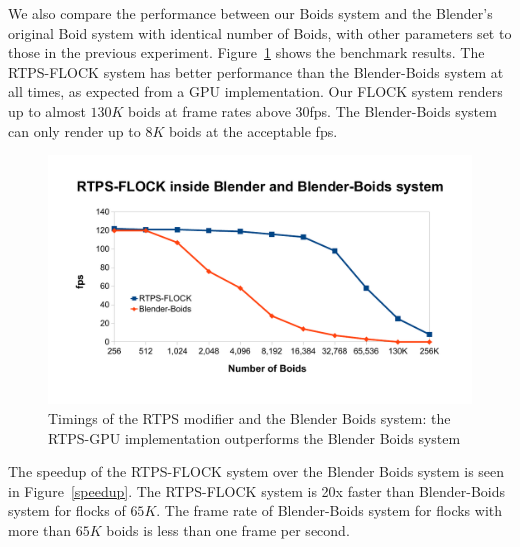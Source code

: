 We also compare the performance between our Boids system and the Blender's original Boid system with identical number of Boids, with other parameters set to 
those in the previous experiment.  
Figure~\ref{RTPSvsBlender} shows the benchmark results. 
The RTPS-FLOCK system has better performance than the Blender-Boids system 
at all times, as expected from a GPU implementation. 
Our FLOCK system renders up to almost $130K$ boids at frame rates above 30fps. 
The Blender-Boids system can only render up to $8K$ boids at the acceptable fps.

\begin{figure}[htbp]
\begin{center}
\includegraphics[scale=0.7]{figures/benchmarks.pdf}
\caption{Timings of the RTPS modifier and the Blender Boids system: the RTPS-GPU implementation outperforms the Blender Boids system}
\label{RTPSvsBlender}
\end{center}
\end{figure}

The speedup of the RTPS-FLOCK system over the Blender Boids system is seen in Figure~\ref{speedup}. The RTPS-FLOCK system is 20x faster than Blender-Boids system for flocks of $65K$. The frame rate of Blender-Boids system for flocks with more than $65K$ boids is less than one frame per second.


